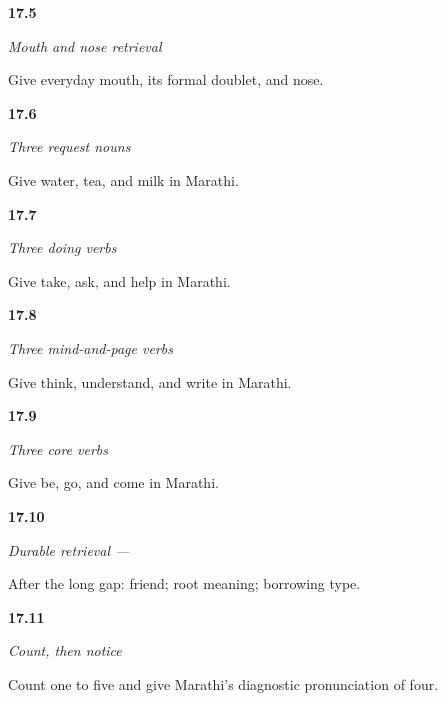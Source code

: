 \noindent\begin{minipage}[t]{\linewidth}
\raggedright
\hypertarget{review-MR-R14-mouth-nose-check}{\textbf{17.5}} \emph{Mouth and nose retrieval}\par
\small Give everyday mouth, its formal doublet, and nose.
\end{minipage}\par\medskip

\noindent\begin{minipage}[t]{\linewidth}
\raggedright
\hypertarget{review-MR-R14-food-check}{\textbf{17.6}} \emph{Three request nouns}\par
\small Give water, tea, and milk in Marathi.
\end{minipage}\par\medskip

\noindent\begin{minipage}[t]{\linewidth}
\raggedright
\hypertarget{review-MR-R14-doing-check}{\textbf{17.7}} \emph{Three doing verbs}\par
\small Give take, ask, and help in Marathi.
\end{minipage}\par\medskip

\noindent\begin{minipage}[t]{\linewidth}
\raggedright
\hypertarget{review-MR-R14-mind-check}{\textbf{17.8}} \emph{Three mind-and-page verbs}\par
\small Give think, understand, and write in Marathi.
\end{minipage}\par\medskip

\noindent\begin{minipage}[t]{\linewidth}
\raggedright
\hypertarget{review-MR-R14-core-check}{\textbf{17.9}} \emph{Three core verbs}\par
\small Give be, go, and come in Marathi.
\end{minipage}\par\medskip

\noindent\begin{minipage}[t]{\linewidth}
\raggedright
\hypertarget{review-MR-R14-mitra-r3-check}{\textbf{17.10}} \emph{Durable retrieval — }\par
\small After the long gap: friend; root meaning; borrowing type.
\end{minipage}\par\medskip

\noindent\begin{minipage}[t]{\linewidth}
\raggedright
\hypertarget{review-MR-R14-numbers-check}{\textbf{17.11}} \emph{Count, then notice}\par
\small Count one to five and give Marathi's diagnostic pronunciation of four.
\end{minipage}\par\medskip

